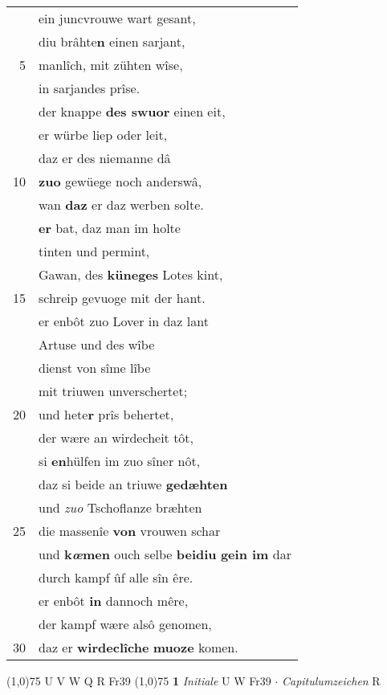 \documentclass[8pt,a4paper,notitlepage]{article}
\begin{document}
\begin{table}[ht]
\begin{minipage}[t]{0.5\linewidth}
\begin{tabular}{rl}
 & ein juncvrouwe wart gesant,\\ 
 & diu brâhte\textbf{n} einen sarjant,\\ 
5 & manlîch, mit zühten wîse,\\ 
 & in sarjandes prîse.\\ 
 & der knappe \textbf{des swuor} einen eit,\\ 
 & er würbe liep oder leit,\\ 
 & daz er des niemanne dâ\\ 
10 & \textbf{zuo} gewüege noch anderswâ,\\ 
 & wan \textbf{daz} er daz werben solte.\\ 
 & \textbf{er} bat, daz man im holte\\ 
 & tinten und permint,\\ 
 & Gawan, des \textbf{küneges} Lotes kint,\\ 
15 & schreip gevuoge mit der hant.\\ 
 & er enbôt zuo Lover in daz lant\\ 
 & Artuse und des wîbe\\ 
 & dienst von sîme lîbe\\ 
 & mit triuwen unverschertet;\\ 
20 & und hete\textbf{r} prîs behertet,\\ 
 & der wære an wirdecheit tôt,\\ 
 & si \textbf{en}hülfen im zuo sîner nôt,\\ 
 & daz si beide an triuwe \textbf{gedæhten}\\ 
 & und \textit{zuo} Tschoflanze bræhten\\ 
25 & die massenîe \textbf{von} vrouwen schar\\ 
 & und \textbf{k\textit{œ}men} ouch selbe \textbf{beidiu} \textbf{gein im} dar\\ 
 & durch kampf ûf alle sîn êre.\\ 
 & er enbôt \textbf{in} dannoch mêre,\\ 
 & der kampf wære alsô genomen,\\ 
30 & daz er \textbf{wirdeclîche} \textbf{muoze} komen.\\ 
\end{tabular}
\scriptsize
\line(1,0){75} \newline
U V W Q R Fr39 \newline
\line(1,0){75} \newline
\textbf{1} \textit{Initiale} U W Fr39   $\cdot$ \textit{Capitulumzeichen} R  \newline

\end{minipage}
\end{table}
\end{document}
